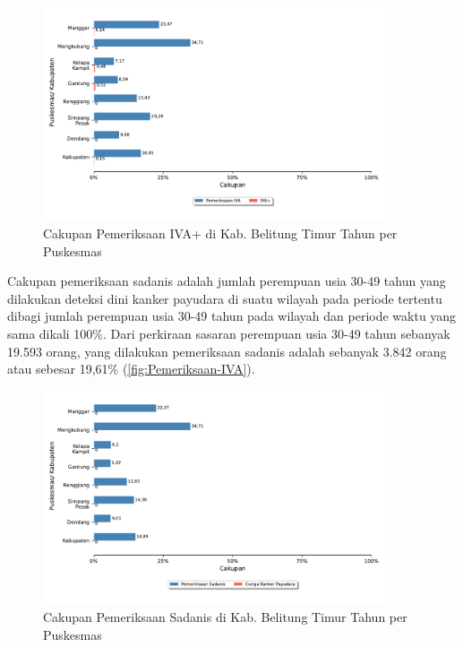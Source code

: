 \begin{figure}[H]
  \centering
  \includegraphics[width=0.9\textwidth]{bab_06/bab_06_15a_IVA}
  \caption{Cakupan Pemeriksaan IVA+ di Kab. Belitung Timur Tahun \tP per Puskesmas}
  \label{fig:Pemeriksaan-IVA}
\end{figure}

Cakupan pemeriksaan sadanis adalah jumlah perempuan usia 30-49 tahun yang dilakukan deteksi dini kanker payudara di suatu wilayah pada periode tertentu dibagi jumlah perempuan usia 30-49 tahun pada wilayah dan periode waktu yang sama dikali 100\%.
Dari perkiraan sasaran perempuan usia 30-49 tahun sebanyak 19.593 orang, yang dilakukan pemeriksaan sadanis adalah sebanyak 3.842 orang atau sebesar 19,61\% (\autoref{fig:Pemeriksaan-IVA}).

\begin{figure}[H]
	\centering
	\includegraphics[width=0.9\textwidth]{bab_06/bab_06_15b_sadanis}
	\caption{Cakupan Pemeriksaan Sadanis di Kab. Belitung Timur Tahun \tP per Puskesmas}
	\label{fig:Pemeriksaan-Sadanis}
\end{figure}

